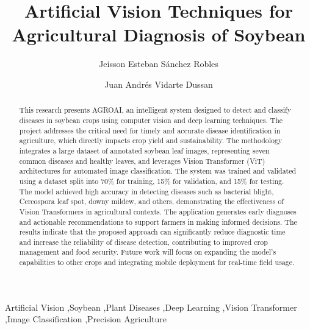 \documentclass[preprint,12pt]{elsarticle}
\begin{document}
\begin{frontmatter}

\title{Artificial Vision Techniques for Agricultural Diagnosis of Soybean}

\author[aff1]{Jeisson Esteban Sánchez Robles}

\author[aff1]{Juan Andrés Vidarte Dussan}


\begin{abstract}
  This research presents AGROAI, an intelligent system designed to detect and classify diseases in soybean crops using computer vision and deep learning techniques. The project addresses the critical need for timely and accurate disease identification in agriculture, which directly impacts crop yield and sustainability. The methodology integrates a large dataset of annotated soybean leaf images, representing seven common diseases and healthy leaves, and leverages Vision Transformer (ViT) architectures for automated image classification. The system was trained and validated using a dataset split into 70\% for training, 15\% for validation, and 15\% for testing. The model achieved high accuracy in detecting diseases such as bacterial blight, Cercospora leaf spot, downy mildew, and others, demonstrating the effectiveness of Vision Transformers in agricultural contexts. The application generates early diagnoses and actionable recommendations to support farmers in making informed decisions. The results indicate that the proposed approach can significantly reduce diagnostic time and increase the reliability of disease detection, contributing to improved crop management and food security. Future work will focus on expanding the model's capabilities to other crops and integrating mobile deployment for real-time field usage.
\end{abstract}
  
\begin{keyword}
  Artificial Vision \sep Soybean \sep Plant Diseases \sep Deep Learning \sep Vision Transformer \sep Image Classification \sep Precision Agriculture
  \end{keyword}  

\end{frontmatter}
\end{document}

